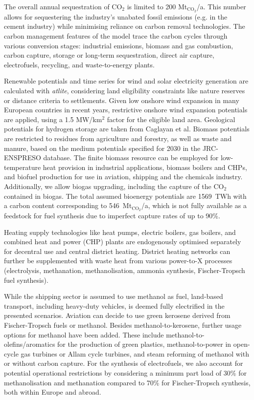 \documentclass[5p,10pt]{elsarticle}
\begin{document}
The overall annual sequestration of CO$_2$ is limited to 200
Mt$_{\text{CO}_2}$/a. This number allows for sequestering the industry's
unabated fossil emissions (e.g. in the cement industry) while minimising
reliance on carbon removal technologies. The carbon management features of the
model trace the carbon cycles through various conversion stages: industrial
emissions, biomass and gas combustion, carbon capture, storage or long-term
sequestration, direct air capture, electrofuels, recycling, and waste-to-energy
plants.

Renewable potentials and time series for wind and solar electricity generation
are calculated with \textit{atlite},\cite{hofmannAtliteLightweight2021}
considering land eligibility constraints like nature reserves or distance
criteria to settlements. Given low onshore wind expansion in many European
countries in recent years,\cite{ourworldindataInstalledWind2023} restrictive
onshore wind expansion potentials are applied, using a 1.5 MW/km$^2$ factor for
the eligible land area. Geological potentials for hydrogen storage are taken
from Caglayan et al.\cite{caglayanTechnicalPotential2020} Biomass potentials are
restricted to residues from agriculture and forestry, as well as waste and
manure, based on the medium potentials specified for 2030 in the JRC-ENSPRESO
database.\cite{ruizENSPRESOOpen2019} The finite biomass resource can be employed
for low-temperature heat provision in industrial applications, biomass boilers
and CHPs, and biofuel production for use in aviation, shipping and the chemicals
industry. Additionally, we allow biogas upgrading, including the capture of the
CO$_2$ contained in biogas. The total assumed bioenergy potentials are 1569~TWh
with a carbon content corresponding to 546~Mt$_{\text{CO}_2}$/a, which is not
fully available as a feedstock for fuel synthesis due to imperfect capture
rates of up to 90\%.

Heating supply technologies like heat pumps, electric boilers, gas boilers, and
combined heat and power (CHP) plants are endogenously optimised separately for
decentral use and central district heating. District heating networks can
further be supplemented with waste heat from various power-to-X processes
(electrolysis, methanation, methanolisation, ammonia synthesis, Fischer-Tropsch
fuel synthesis).

While the shipping sector is assumed to use methanol as fuel, land-based
transport, including heavy-duty vehicles, is deemed fully electrified in the
presented scenarios. Aviation can decide to use green kerosene derived from
Fischer-Tropsch fuels or methanol. Besides methanol-to-kerosene, further
usage options for methanol have been added.
These include
methanol-to-olefins/aromatics for the production of green plastics,
methanol-to-power\cite{brownUltralongdurationEnergyStorage2023} in open-cycle gas
turbines or Allam cycle turbines, and steam reforming of methanol with or
without carbon capture. For the synthesis of electrofuels, we also account for
potential operational restrictions by considering a minimum part load of 30\%
for methanolisation and methanation compared to 70\% for Fischer-Tropsch
synthesis, both within Europe and abroad.
\end{document}
